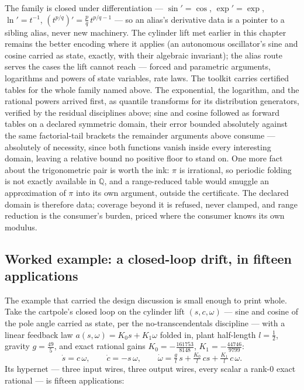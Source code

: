 The family is closed under differentiation --- $\sin' = \cos$,
$\exp' = \exp$, $\ln' = t^{-1}$, $(t^{p/q})' = \tfrac{p}{q}\,
t^{p/q - 1}$ --- so an alias's derivative data is a pointer to a
sibling alias, never new machinery. The cylinder lift met earlier in
this chapter remains the better encoding where it applies (an
autonomous oscillator's sine and cosine carried as state, exactly,
with their algebraic invariant); the alias route serves the cases
the lift cannot reach --- forced and parametric arguments,
logarithms and powers of state variables, rate laws. The toolkit
carries certified tables for the whole family named above. The
exponential, the logarithm, and the rational powers arrived first,
as quantile transforms for its distribution generators, verified by
the residual disciplines above; sine and cosine followed as forward
tables on a declared symmetric domain, their error bounded
absolutely against the same factorial-tail brackets the remainder
arguments above consume --- absolutely of necessity, since both
functions vanish inside every interesting domain, leaving a relative
bound no positive floor to stand on. One more fact about the
trigonometric pair is worth the ink: $\pi$ is irrational, so
periodic folding is not exactly available in $\mathbb{Q}$, and a
range-reduced table would smuggle an approximation of $\pi$ into its
own argument, outside the certificate. The declared domain is
therefore data; coverage beyond it is refused, never clamped, and
range reduction is the consumer's burden, priced where the consumer
knows its own modulus.

\subsection*{Worked example: a closed-loop drift, in fifteen applications}

The example that carried the design discussion is small enough to
print whole. Take the cartpole's closed loop on the cylinder lift
$(s, c, \omega)$ --- sine and cosine of the pole angle carried as
state, per the no-transcendentals discipline --- with a linear
feedback law $a(s, \omega) = K_0 s + K_1 \omega$ folded in, plant
half-length $l = \tfrac12$, gravity $g = \tfrac{49}{5}$, and exact
rational gains $K_0 = -\tfrac{161753}{8148}$,
$K_1 = -\tfrac{44746}{9799}$:
\[
\dot s = c\,\omega, \qquad
\dot c = -s\,\omega, \qquad
\dot\omega
= \tfrac{g}{l}\,s + \tfrac{K_0}{l}\,c s + \tfrac{K_1}{l}\,c\,\omega .
\]
Its hypernet --- three input wires, three output wires, every scalar a
rank-0 exact rational --- is fifteen applications:

